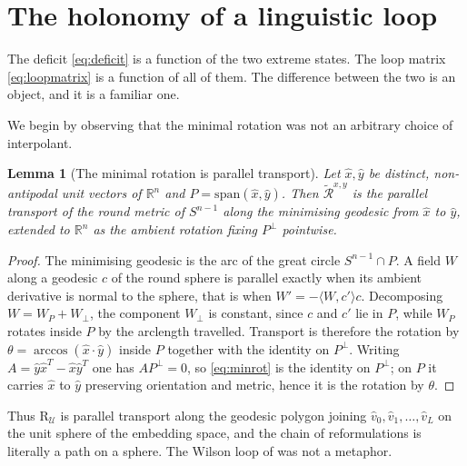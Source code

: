 \documentclass[11pt,a4paper]{article}
\theoremstyle{plain}
\newtheorem{lemma}[theorem]{Lemma}
\theoremstyle{definition}
\numberwithin{equation}{section}
\newcommand{\R}{\mathbb{R}}
\newcommand{\Rmin}{\widetilde{\mathcal{R}}}
\newcommand{\Uc}{\mathcal{U}}
\begin{document}
\section{The holonomy of a linguistic loop}\label{sec:holonomy}

The deficit \eqref{eq:deficit} is a function of the two extreme states.
The loop matrix \eqref{eq:loopmatrix} is a function of all of them. The
difference between the two is an object, and it is a familiar one.

We begin by observing that the minimal rotation was not an arbitrary
choice of interpolant.

\begin{lemma}[The minimal rotation is parallel transport]\label{lem:transport}
Let $\hat{x},\hat{y}$ be distinct, non-antipodal unit vectors of $\R^n$
and $P = \mathrm{span}(\hat{x},\hat{y})$. Then $\Rmin^{x,y}$ is the
parallel transport of the round metric of $S^{n-1}$ along the minimising
geodesic from $\hat{x}$ to $\hat{y}$, extended to $\R^n$ as the ambient
rotation fixing $P^{\perp}$ pointwise.
\end{lemma}

\begin{proof}
The minimising geodesic is the arc of the great circle $S^{n-1}\cap P$.
A field $W$ along a geodesic $c$ of the round sphere is parallel exactly
when its ambient derivative is normal to the sphere, that is when
$W' = -\langle W, c'\rangle c$. Decomposing $W = W_P + W_{\perp}$, the
component $W_\perp$ is constant, since $c$ and $c'$ lie in $P$, while
$W_P$ rotates inside $P$ by the arclength travelled. Transport is
therefore the rotation by $\theta = \arccos(\hat{x}\cdot\hat{y})$ inside
$P$ together with the identity on $P^\perp$. Writing
$A = \hat{y}\hat{x}^T - \hat{x}\hat{y}^T$ one has $A P^\perp = 0$, so
\eqref{eq:minrot} is the identity on $P^\perp$; on $P$ it carries
$\hat{x}$ to $\hat{y}$ preserving orientation and metric, hence it is
the rotation by $\theta$.
\end{proof}

Thus $\mathrm{R}_\Uc$ is parallel transport along the geodesic polygon
joining $\hat{v}_0, \hat{v}_1, \dots, \hat{v}_L$ on the unit sphere of
the embedding space, and the chain of reformulations is literally a path
on a sphere. The Wilson loop of \cite{CM25} was not a metaphor.
\end{document}
